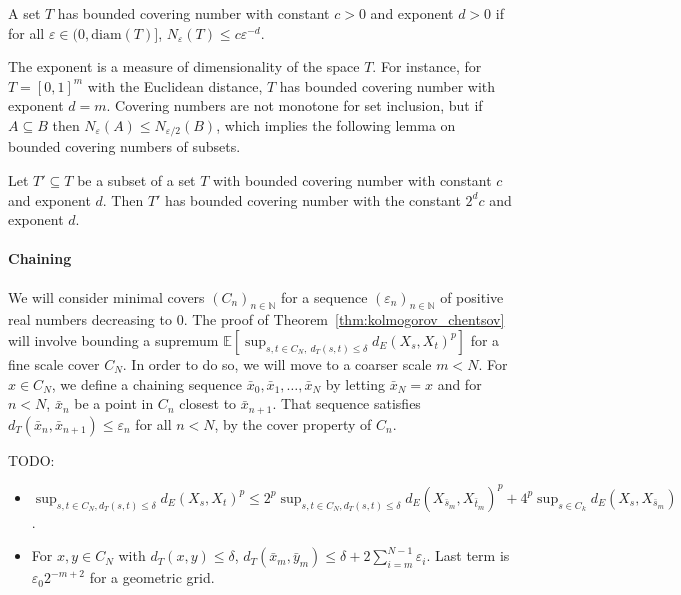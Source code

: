 \documentclass[lean]{Draft}
\makeatletter
\newcommand\leanlink{\begingroup\catcode`\#=12\relax\@leanlink}
\newcommand\@leanlink[2]{\endgroup
\href{#1}
{\texttt{\detokenize{#2}}}}
\newcommand{\docs}[1]{%
\leanlink{https://leanprover-community.github.io/mathlib4_docs/find/?pattern=#1\#doc}
{#1}}
\makeatother
\begin{document}
\begin{definition}\label{def:bounded_covering_number}
A set $T$ has bounded covering number with constant $c > 0$ and exponent $d > 0$ if for all $\varepsilon \in (0, \mathrm{diam}(T)]$, $N_\varepsilon(T) \le c \varepsilon^{-d}$.
\end{definition}

The exponent is a measure of dimensionality of the space $T$.
For instance, for $T = [0,1]^m$ with the Euclidean distance, $T$ has bounded covering number with exponent $d = m$.
Covering numbers are not monotone for set inclusion, but if $A \subseteq B$ then $N_\varepsilon(A) \le N_{\varepsilon/2}(B)$, which implies the following lemma on bounded covering numbers of subsets.

\begin{lemma}[\docs{HasBoundedInternalCoveringNumber.subset}]\label{lem:covering_number_subset}
Let $T' \subseteq T$ be a subset of a set $T$ with bounded covering number with constant $c$ and exponent $d$.
Then $T'$ has bounded covering number with the constant $2^d c$ and exponent $d$.
\end{lemma}


\paragraph{Chaining}

We will consider minimal covers $(C_n)_{n \in \mathbb{N}}$ for a sequence $(\varepsilon_n)_{n \in \mathbb{N}}$ of positive real numbers decreasing to $0$.
The proof of Theorem~\ref{thm:kolmogorov_chentsov} will involve bounding a supremum $\mathbb{E}\left[\sup_{s, t \in C_N, \: d_T(s, t) \le \delta}d_E(X_s, X_t)^p\right]$ for a fine scale cover $C_N$.
In order to do so, we will move to a coarser scale $m < N$.
For $x \in C_N$, we define a chaining sequence $\bar{x}_0, \bar{x}_1, \ldots, \bar{x}_N$ by letting $\bar{x}_N = x$ and for $n < N$, $\bar{x}_n$ be a point in $C_n$ closest to $\bar{x}_{n+1}$.
That sequence satisfies $d_T(\bar{x}_n, \bar{x}_{n+1}) \le \varepsilon_n$ for all $n < N$, by the cover property of $C_n$.

TODO:
\begin{itemize}
  \item $\sup_{s, t \in C_N, d_T(s, t) \le \delta} d_E(X_s, X_t)^p \le 2^p \sup_{s, t \in C_N, d_T(s, t) \le \delta} d_E(X_{\bar{s}_m}, X_{\bar{t}_m})^p + 4^p \sup_{s \in C_k} d_E(X_s, X_{\bar{s}_m})$.
  \item For $x, y \in C_N$ with $d_T(x, y) \le \delta$, $d_T(\bar{x}_m, \bar{y}_m) \le \delta + 2 \sum_{i=m}^{N-1}\varepsilon_i$. Last term is $\varepsilon_0 2^{-m+2}$ for a geometric grid.
\end{itemize}
\end{document}
